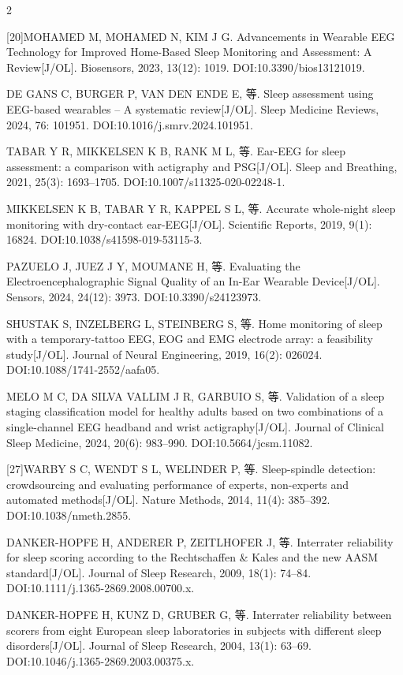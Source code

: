 \documentclass[UTF8,zihao=5,fontset=none]{ctexart}
\begin{document}
\begin{multicols}{2}
{[20]\quad MOHAMED M, MOHAMED N, KIM J G. Advancements in Wearable EEG Technology for Improved Home-Based Sleep Monitoring and Assessment: A Review[J/OL]. Biosensors, 2023, 13(12): 1019. DOI:10.3390/bios13121019.\par
[21]\quad DE GANS C, BURGER P, VAN DEN ENDE E, 等. Sleep assessment using EEG-based wearables – A systematic review[J/OL]. Sleep Medicine Reviews, 2024, 76: 101951. DOI:10.1016/j.smrv.2024.101951.\par
[22]\quad TABAR Y R, MIKKELSEN K B, RANK M L, 等. Ear-EEG for sleep assessment: a comparison with actigraphy and PSG[J/OL]. Sleep and Breathing, 2021, 25(3): 1693--1705. DOI:10.1007/s11325-020-02248-1.\par
[23]\quad MIKKELSEN K B, TABAR Y R, KAPPEL S L, 等. Accurate whole-night sleep monitoring with dry-contact ear-EEG[J/OL]. Scientific Reports, 2019, 9(1): 16824. DOI:10.1038/s41598-019-53115-3.\par
[24]\quad PAZUELO J, JUEZ J Y, MOUMANE H, 等. Evaluating the Electroencephalographic Signal Quality of an In-Ear Wearable Device[J/OL]. Sensors, 2024, 24(12): 3973. DOI:10.3390/s24123973.\par
[25]\quad SHUSTAK S, INZELBERG L, STEINBERG S, 等. Home monitoring of sleep with a temporary-tattoo EEG, EOG and EMG electrode array: a feasibility study[J/OL]. Journal of Neural Engineering, 2019, 16(2): 026024. DOI:10.1088/1741-2552/aafa05.\par
[26]\quad MELO M C, DA SILVA VALLIM J R, GARBUIO S, 等. Validation of a sleep staging classification model for healthy adults based on two combinations of a single-channel EEG headband and wrist actigraphy[J/OL]. Journal of Clinical Sleep Medicine, 2024, 20(6): 983--990. DOI:10.5664/jcsm.11082.\par
[27]\quad WARBY S C, WENDT S L, WELINDER P, 等. Sleep-spindle detection: crowdsourcing and evaluating performance of experts, non-experts and automated methods[J/OL]. Nature Methods, 2014, 11(4): 385--392. DOI:10.1038/nmeth.2855.\par
[28]\quad DANKER-HOPFE H, ANDERER P, ZEITLHOFER J, 等. Interrater reliability for sleep scoring according to the Rechtschaffen \& Kales and the new AASM standard[J/OL]. Journal of Sleep Research, 2009, 18(1): 74--84. DOI:10.1111/j.1365-2869.2008.00700.x.\par
[29]\quad DANKER-HOPFE H, KUNZ D, GRUBER G, 等. Interrater reliability between scorers from eight European sleep laboratories in subjects with different sleep disorders[J/OL]. Journal of Sleep Research, 2004, 13(1): 63--69. DOI:10.1046/j.1365-2869.2003.00375.x.\par
}
\end{multicols}
\end{document}
